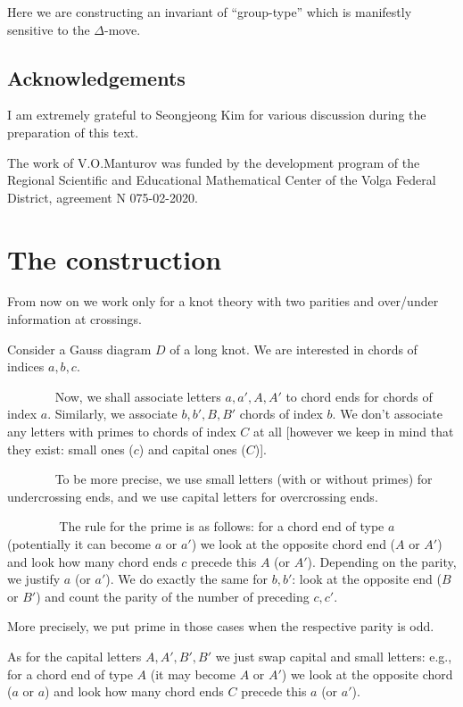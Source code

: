 \documentclass[12pt]{article}
\theoremstyle{definition}
\theoremstyle{remark}
\begin{document}
Here we are constructing an invariant of ``group-type'' which is manifestly sensitive to the $\Delta$-move.

\subsection{Acknowledgements}

I am extremely grateful to Seongjeong Kim for various discussion during the preparation of this text.

The work of V.O.Manturov was funded by the development program of the Regional
Scientific and Educational Mathematical Center of the Volga Federal District, agreement
N 075-02-2020.


\section{The construction}

From now on we work only for a knot theory with two parities and over/under information at crossings.

Consider a Gauss diagram $D$ of a long knot. We are interested in chords of indices $a,b,c$.

         Now, we shall associate letters $a,a',A,A'$ to chord ends for chords of index $a$.
Similarly, we associate $b,b',B,B'$ chords of index $b$. We don't associate any letters with primes to chords of index $C$ at all
[however we keep in mind that they exist: small ones ($c$) and capital ones ($C$)].


         To be more precise, we use small letters (with or without primes) for undercrossing ends,
and we use capital letters for overcrossing ends.

          The rule for the prime is as follows: for a chord end of type $a$ (potentially it can become $a$ or $a'$) we
look at the opposite chord end ($A$ or $A'$) and look how many
chord ends $c$ precede this $A$ (or $A'$). Depending on the parity, we justify
$a$ (or $a'$). We do exactly the same for $b,b'$: look at the opposite end ($B$ or $B'$)
and count the parity of the number of preceding $c,c'$.


More precisely, we put prime in those cases when the respective parity is odd.

As for the capital letters $A,A',B',B'$ we just swap capital and small letters:
e.g., for a chord end of type $A$ (it may become $A$ or $A'$)
we look at the opposite chord ($a$ or $a$) and look how many chord ends $C$ precede this $a$
(or $a'$).
\end{document}
